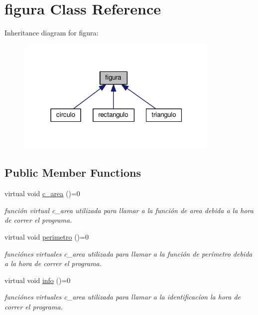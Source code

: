 \hypertarget{classfigura}{}\section{figura Class Reference}
\label{classfigura}


Inheritance diagram for figura\+:\nopagebreak
\begin{figure}[H]
\begin{center}
\leavevmode
\includegraphics[width=277pt]{classfigura__inherit__graph}
\end{center}
\end{figure}
\subsection*{Public Member Functions}
\begin{DoxyCompactItemize}
\item 
\mbox{\label{classfigura_a1496fac67d12bfc3ca8a1ed9cebdd49b}} 
virtual void \hyperlink{classfigura_a1496fac67d12bfc3ca8a1ed9cebdd49b}{c\+\_\+area} ()=0
\begin{DoxyCompactList}\small\item\em función virtual c\+\_\+area utilizada para llamar a la función de area debida a la hora de correr el programa. \end{DoxyCompactList}\item 
\mbox{\label{classfigura_a4e84ec7744c66ef59e35631485c34c4f}} 
virtual void \hyperlink{classfigura_a4e84ec7744c66ef59e35631485c34c4f}{perimetro} ()=0
\begin{DoxyCompactList}\small\item\em funciónes virtuales c\+\_\+area utilizada para llamar a la función de perímetro debida a la hora de correr el programa. \end{DoxyCompactList}\item 
\mbox{\label{classfigura_a8a33e4001eb52783bc6c04cdf32eedf6}} 
virtual void \hyperlink{classfigura_a8a33e4001eb52783bc6c04cdf32eedf6}{info} ()=0
\begin{DoxyCompactList}\small\item\em funciónes virtuales c\+\_\+area utilizada para llamar a la identificacíon la hora de correr el programa. \end{DoxyCompactList}\end{DoxyCompactItemize}

